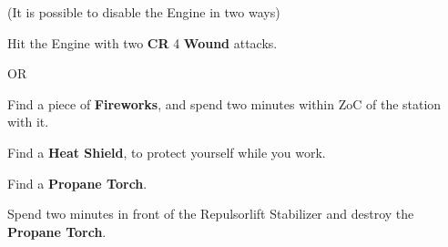 \documentclass[green]{airship}
\begin{document}
(It is possible to disable the Engine in two ways)
\begin{enum}[Engine]
  \item Hit the Engine with two {\bf CR} 4 {\bf Wound} attacks.
  \item OR
  \item Find a piece of {\bf Fireworks}, and spend two minutes within ZoC of the station with it.
\end{enum}

\begin{enum}
  \item Find a {\bf Heat Shield}, to protect yourself while you work.
  \item Find a {\bf Propane Torch}.
  \item Spend two minutes in front of the Repulsorlift Stabilizer and destroy the {\bf Propane Torch}.
\end{enum}
\end{document}
